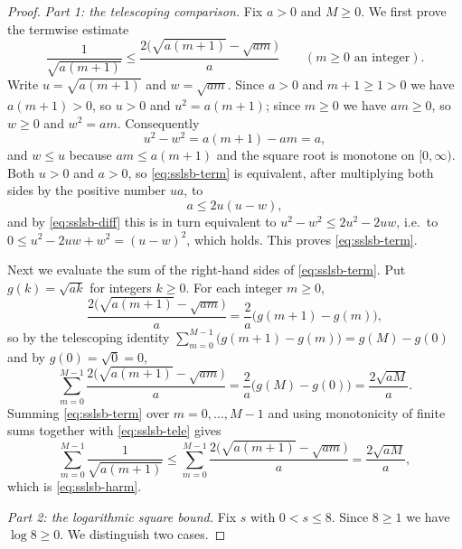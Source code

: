 \begin{proof}
\emph{Part 1: the telescoping comparison.}
Fix $a>0$ and $M\ge 0$. We first prove the termwise estimate
\begin{equation}\label{eq:sslsb-term}
  \frac{1}{\sqrt{a(m+1)}}\le\frac{2\bigl(\sqrt{a(m+1)}-\sqrt{am}\bigr)}{a}
  \qquad(m\ge 0\text{ an integer}).
\end{equation}
Write $u=\sqrt{a(m+1)}$ and $w=\sqrt{am}$. Since $a>0$ and $m+1\ge 1>0$ we have
$a(m+1)>0$, so $u>0$ and $u^2=a(m+1)$; since $m\ge 0$ we have $am\ge 0$, so
$w\ge 0$ and $w^2=am$. Consequently
\begin{equation}\label{eq:sslsb-diff}
  u^2-w^2=a(m+1)-am=a ,
\end{equation}
and $w\le u$ because $am\le a(m+1)$ and the square root is monotone on
$[0,\infty)$. Both $u>0$ and $a>0$, so \eqref{eq:sslsb-term} is equivalent, after
multiplying both sides by the positive number $ua$, to
\[
  a\le 2u(u-w),
\]
and by \eqref{eq:sslsb-diff} this is in turn equivalent to
$u^2-w^2\le 2u^2-2uw$, i.e.\ to $0\le u^2-2uw+w^2=(u-w)^2$, which holds. This
proves \eqref{eq:sslsb-term}.

Next we evaluate the sum of the right-hand sides of \eqref{eq:sslsb-term}. Put
$g(k)=\sqrt{ak}$ for integers $k\ge 0$. For each integer $m\ge 0$,
\[
  \frac{2\bigl(\sqrt{a(m+1)}-\sqrt{am}\bigr)}{a}
   =\frac{2}{a}\bigl(g(m+1)-g(m)\bigr),
\]
so by the telescoping identity
$\sum_{m=0}^{M-1}\bigl(g(m+1)-g(m)\bigr)=g(M)-g(0)$ and by $g(0)=\sqrt{0}=0$,
\begin{equation}\label{eq:sslsb-tele}
  \sum_{m=0}^{M-1}\frac{2\bigl(\sqrt{a(m+1)}-\sqrt{am}\bigr)}{a}
   =\frac{2}{a}\bigl(g(M)-g(0)\bigr)=\frac{2\sqrt{aM}}{a}.
\end{equation}
Summing \eqref{eq:sslsb-term} over $m=0,\dots,M-1$ and using monotonicity of
finite sums together with \eqref{eq:sslsb-tele} gives
\[
  \sum_{m=0}^{M-1}\frac{1}{\sqrt{a(m+1)}}
   \le\sum_{m=0}^{M-1}\frac{2\bigl(\sqrt{a(m+1)}-\sqrt{am}\bigr)}{a}
   =\frac{2\sqrt{aM}}{a},
\]
which is \eqref{eq:sslsb-harm}.

\emph{Part 2: the logarithmic square bound.}
Fix $s$ with $0<s\le 8$. Since $8\ge 1$ we have $\log 8\ge 0$. We distinguish
two cases.


\end{proof}

